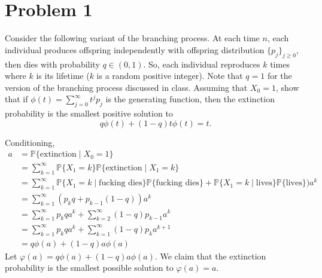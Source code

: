 \documentclass[11pt]{article}
\newcommand{\bbP}{\mathbb{P}}
\begin{document}
	
	
	\psetheader
\section*{Problem 1}
\begin{problem}
    Consider the following variant of the branching process. At each time \( n \), each individual produces offspring independently with offspring distribution \(\{p_j\}_{j \geq 0}\), then dies with probability \( q \in (0,1) \). So, each individual reproduces \( k \) times where \( k \) is its lifetime (\( k \) is a random positive integer). Note that \( q = 1 \) for the version of the branching process discussed in class. Assuming that \( X_0 = 1 \), show that if \( \phi(t) = \sum_{j=0}^\infty t^j p_j \) is the generating function, then the extinction probability is the smallest positive solution to
\[
q\phi(t) + (1-q)t\phi(t) = t.
\]

\end{problem}
\begin{solution}
Conditioning, 
\begin{align*}
  a &= \bbP\{\text{extinction} \mid X_0 = 1\}\\ &= \sum_{k=1}^\infty \bbP\{X_1 = k\}\bbP\{\text{extinction} \mid X_1 = k \}  \\
  &= \sum_{k=1}^\infty \bbP\{X_1 = k \mid \text{fucking dies}\}\bbP\{\text{fucking dies}\} + \bbP\{X_1 = k \mid \text{lives}\}\bbP\{\text{lives}\})a^k\\
  &= \sum_{k=1}^\infty (p_kq + p_{k-1}(1-q))a^k\\
  &= \sum_{k=1}^\infty p_k qa^k + \sum_{k=2}^\infty (1-q)p_{k-1}a^k\\
  &= \sum_{k=1}^\infty p_k qa^k + \sum_{k=1}^\infty (1-q)p_{k}a^{k+1}\\
  &= q\phi(a) + (1-q) a \phi(a)
\end{align*}
Let $\varphi(a) = q\phi(a) + (1-q) a \phi(a).$ We claim that the extinction probability is the smallest possible solution to $\varphi(a) = a.$ 
\end{solution} 



\newpage
\end{document}
